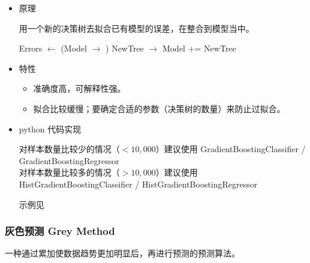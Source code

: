 \documentclass{article}
\begin{document}
\begin{itemize}

\item{原理}

用一个新的决策树去拟合已有模型的误差，在整合到模型当中。

\begin{algorithmic}
    \Repeat
    \State Errors $\leftarrow$ (Model $\rightarrow$ )
    \State NewTree $\rightarrow$ 
    \State Model += NewTree
\EndProcedure
\end{algorithmic}

\item{特性}

\begin{itemize}
    \item 准确度高，可解释性强。
    \item 拟合比较缓慢；要确定合适的参数（决策树的数量）来防止过拟合。
\end{itemize}

\item{python 代码实现}

对样本数量比较少的情况（$<10,000$）建议使用 GradientBoostingClassifier / GradientBoostingRegressor\\
对样本数量比较多的情况（$>10,000$）建议使用 HistGradientBoostingClassifier / HistGradientBoostingRegressor

示例见

\end{itemize}

\subsubsection{灰色预测 Grey Method}

一种通过累加使数据趋势更加明显后，再进行预测的预测算法。
\end{document}
